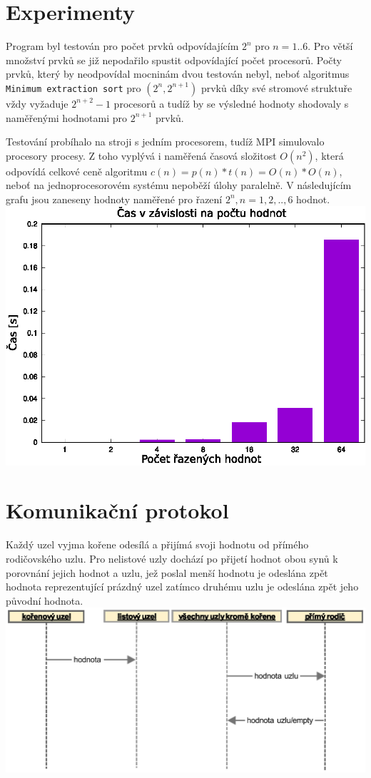 \documentclass[12pt,a4paper,titlepage,final]{article}
\begin{document}
\section{Experimenty}
Program byl testován pro počet prvků odpovídajícím $2^n$ pro $n = 1 .. 6$. Pro větší množství prvků se již nepodařilo spustit odpovídající počet procesorů.
Počty prvků, který by neodpovídal mocninám dvou testován nebyl, neboť algoritmus \texttt{Minimum extraction sort} pro $(2^n,2^{n+1})$ prvků díky své stromové struktuře vždy
vyžaduje $2^{n+2}-1$ procesorů a tudíž by se výsledné hodnoty shodovaly s naměřenými hodnotami pro $2^{n+1}$ prvků.

Testování probíhalo na stroji s jedním procesorem, tudíž MPI simulovalo procesory procesy. Z toho
vyplývá i naměřená časová složitost $O (n^2)$, která odpovídá celkové ceně algoritmu $c(n) = p(n)*t(n) = O (n) * O (n)$,
neboť na jednoprocesorovém systému nepoběží úlohy paralelně. V následujícím grafu jsou zaneseny hodnoty naměřené pro řazení $2^n, n = {1,2,..,6}$ hodnot.
\includegraphics[width=14cm,keepaspectratio]{time.eps}

\section{Komunikační protokol}
Každý uzel vyjma kořene odesílá a přijímá svoji hodnotu od přímého rodičovského uzlu.
Pro nelistové uzly dochází po přijetí hodnot obou synů k porovnání jejich hodnot a 
uzlu, jež poslal menší hodnotu je odeslána zpět hodnota reprezentující prázdný uzel zatímco druhému uzlu
je odeslána zpět jeho původní hodnota. \\
\includegraphics[width=14cm,keepaspectratio]{sequence.eps}
\end{document}
